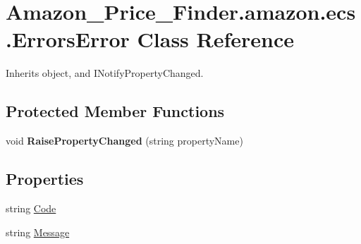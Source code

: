 \hypertarget{class_amazon___price___finder_1_1amazon_1_1ecs_1_1_errors_error}{\section{Amazon\-\_\-\-Price\-\_\-\-Finder.\-amazon.\-ecs.\-Errors\-Error Class Reference}
\label{class_amazon___price___finder_1_1amazon_1_1ecs_1_1_errors_error}
}


 




Inherits object, and I\-Notify\-Property\-Changed.

\subsection*{Protected Member Functions}
\begin{DoxyCompactItemize}
\item 
\hypertarget{class_amazon___price___finder_1_1amazon_1_1ecs_1_1_errors_error_afb2c79881be79c802626d3338458623a}{void {\bfseries Raise\-Property\-Changed} (string property\-Name)}\label{class_amazon___price___finder_1_1amazon_1_1ecs_1_1_errors_error_afb2c79881be79c802626d3338458623a}

\end{DoxyCompactItemize}
\subsection*{Properties}
\begin{DoxyCompactItemize}
\item 
\hypertarget{class_amazon___price___finder_1_1amazon_1_1ecs_1_1_errors_error_ac49d9476a399f0166e37a1264a67cdfc}{string \hyperlink{class_amazon___price___finder_1_1amazon_1_1ecs_1_1_errors_error_ac49d9476a399f0166e37a1264a67cdfc}{Code}}\label{class_amazon___price___finder_1_1amazon_1_1ecs_1_1_errors_error_ac49d9476a399f0166e37a1264a67cdfc}

\begin{DoxyCompactList}\small\item\em \end{DoxyCompactList}\item 
\hypertarget{class_amazon___price___finder_1_1amazon_1_1ecs_1_1_errors_error_ad77c7e4ab8d4d5148f25728d00585d15}{string \hyperlink{class_amazon___price___finder_1_1amazon_1_1ecs_1_1_errors_error_ad77c7e4ab8d4d5148f25728d00585d15}{Message}}\label{class_amazon___price___finder_1_1amazon_1_1ecs_1_1_errors_error_ad77c7e4ab8d4d5148f25728d00585d15}

\begin{DoxyCompactList}\small\item\em \end{DoxyCompactList}\end{DoxyCompactItemize}

